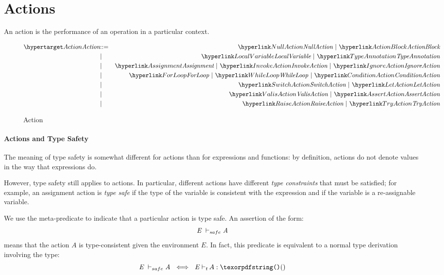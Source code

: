 \chapter{Actions}
\label{actions}

An action is the performance of an operation in a particular context. 

\begin{figure}[htbp]
\begin{eqnarray*}
\ntDef{Action}&\arrow&\ntRef{NullAction}\ \choice\ \ntRef{ActionBlock}\\
&\choice&\ntRef{LocalVariable}\ \choice\ \ntRef{TypeAnnotation}\\
&\choice&\ntRef{Assignment}\ \choice\ \ntRef{InvokeAction}\ \choice\ \ntRef{IgnoreAction}\\
&\choice&\ntRef{ForLoop}\ \choice\ \ntRef{WhileLoop}\ \choice\ \ntRef{ConditionAction}\\
&\choice&\ntRef{SwitchAction}\ \choice\ \ntRef{LetAction}\\
&\choice&\ntRef{ValisAction}\ \choice\ \ntRef{AssertAction}\\
&\choice&\ntRef{RaiseAction}\ \choice\ \ntRef{TryAction}
\end{eqnarray*}
\caption{Action}
\label{actionFig}
\end{figure}

\subsubsection{Actions and Type Safety}
\label{actionTypeSafety}
The meaning of type safety is somewhat different for actions than for expressions and functions: by definition, actions do not denote values in the way that expressions do.

However, type safety still applies to actions. In particular, different actions have different \emph{type constraints} that must be satisfied; for example, an assignment action is \emph{type safe} if the type of the variable is consistent with the expression and if the variable is a re-assignable variable.

We use the meta-predicate \safeinf{} to indicate that a particular action is type safe. An assertion of the form:
\[\emph{E}~\vdash_{safe}\emph{A}\]
means that the action $A$ is type-consistent given the environment $E$. In fact, this predicate is equivalent to a normal type derivation involving the \q{()} type:
\[\typesafe{E}{A}\ \iff\ \typeprd{E}{A}{\q{()}}\]

